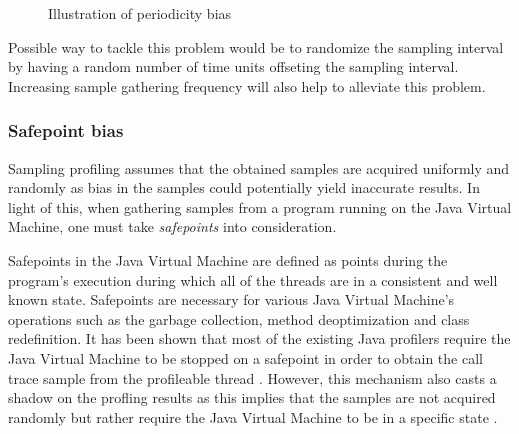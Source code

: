 \documentclass[..thesis.tex]{subfiles}
\begin{document}
\begin{figure}[H]
\centering
{}
\caption{Illustration of periodicity bias}
\label{fig:periodicityBias}
\end{figure}

Possible way to tackle this problem would be to randomize the sampling interval by having a random number of time units offseting the sampling interval. Increasing sample gathering frequency will also help to alleviate this problem.

\subsubsection{Safepoint bias}
Sampling profiling assumes that the obtained samples are acquired uniformly and randomly as bias in the samples could potentially yield inaccurate results. In light of this, when gathering samples from a program running on the Java Virtual Machine, one must take \textit{safepoints} into consideration.

Safepoints in the Java Virtual Machine are defined as points during the program's execution during which all of the threads are in a consistent and well known state. Safepoints are necessary for various Java Virtual Machine's operations such as the garbage collection, method deoptimization and class redefinition.\cite{hotspot_glossary} It has been shown that most of the existing Java profilers require the Java Virtual Machine to be stopped on a safepoint in order to obtain the call trace sample from the profileable thread \cite{wakart_psychosomatic_2016}. However, this mechanism also casts a shadow on the profling results as this implies that the samples are not acquired randomly but rather require the Java Virtual Machine to be in a specific state \cite{mytkowicz_evaluating_2010}. 
\end{document}
